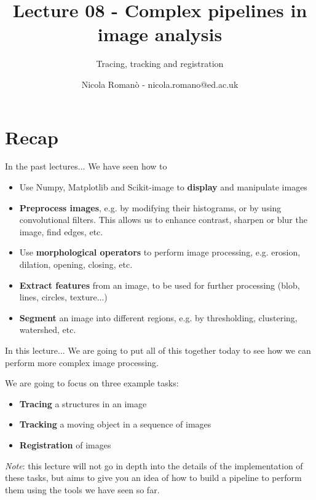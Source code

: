 \documentclass[9pt, aspectratio=169]{beamer}
\author{Nicola Roman\`o - nicola.romano@ed.ac.uk}
\title{Lecture 08 - Complex pipelines in image analysis}
\subtitle{Tracing, tracking and registration}
\date{}
\begin{document}

\begin{frame}
    \titlepage
\end{frame}

\section{Recap}

\begin{frame}
    {In the past lectures...}
    We have seen how to

    \begin{itemize}
        \item [\checkmark] Use Numpy, Matplotlib and Scikit-image to \textbf{display} and manipulate images
        \item [\checkmark] \textbf{Preprocess images}, e.g. by modifying their histograms, or by using convolutional filters. This allows us to enhance contrast, sharpen or blur the image, find edges, etc.
        \item [\checkmark] Use \textbf{morphological operators} to perform image processing, e.g. erosion, dilation, opening, closing, etc.
        \item [\checkmark] \textbf{Extract features} from an image, to be used for further processing (blob, lines, circles, texture...)
        \item [\checkmark] \textbf{Segment} an image into different regions, e.g. by thresholding, clustering, watershed, etc.
    \end{itemize}
\end{frame}

\begin{frame}
    {In this lecture...}
    We are going to put all of this together today to see how we can perform more complex image processing.

    We are going to focus on three example tasks:

    \begin{itemize}
        \item [\checkmark] \textbf{Tracing} a structures in an image
        \item [\checkmark] \textbf{Tracking} a moving object in a sequence of images
        \item [\checkmark] \textbf{Registration} of images
    \end{itemize}

    \small
    \textit{Note}: this lecture will not go in depth into the details of the implementation of these tasks, but aims to give you an idea of how to build a pipeline to perform them using the tools we have seen so far.
\end{frame}
\end{document}
